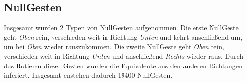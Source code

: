 \subsection{NullGesten}
Insgesamt wurden 2 Typen von NullGesten aufgenommen. Die erste NullGeste geht \textit{Oben} rein, verschieden weit in Richtung \textit{Unten} und kehrt anschließend um, um bei \textit{Oben} wieder rauszukommen. Die zweite
NullGeste geht \textit{Oben} rein, verschieden weit in Richtung \textit{Unten} und anschließend \textit{Rechts} wieder raus. Durch das Rotieren dieser Gesten wurden die Equivalente aus den anderen Richtungen inferiert.
Insgesamt enstehen dadurch 19400 NullGesten.